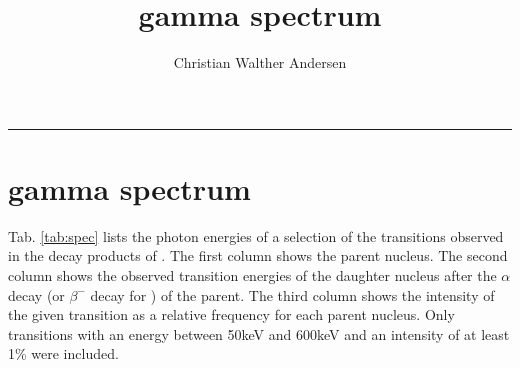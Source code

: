 \documentclass[a4paper,article]{memoir}
\title{\isotope[223]{Ra} gamma spectrum} 	%
\author{Christian Walther Andersen}		%
\begin{document}
	
\setlength{\parindent}{0pt}

\maketitle
\fancybreak{$*\quad*\quad*$}
\vspace{5mm}


\section*{ gamma spectrum}

Tab. \ref{tab:spec} lists the photon energies of a selection of the transitions 
observed in the decay products of . The first column shows the 
parent nucleus. The second column shows the observed transition energies of the 
daughter nucleus after the $\alpha$ decay (or $\beta^-$ decay for 
) of the parent. The third column shows the intensity of the 
given transition as a relative frequency for each parent nucleus. Only 
transitions with an energy between 50\si{keV} and 600\si{keV} and an intensity 
of at least 1\% were included.
\end{document}
